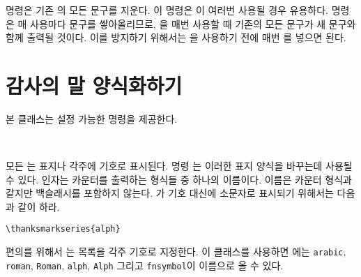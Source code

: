 \documentclass[10pt,a4paper]{oblivoir}
\begin{document}
\cmd{\emptythanks} 명령은 기존 \cmd{\thanks}의 모든 문구를 지운다.
이 명령은 \cmd{\maketitle}이 여러번 사용될 경우 유용하다.
\cmd{\thanks} 명령은 매 사용마다 문구를 쌓아올리므로, \cmd{\maketitle}을 매번
사용할 때 기존의 모든 \cmd{\thanks} 문구가 새 문구와 함께 출력될 것이다.
이를 방지하기 위해서는 \cmd{\maketitle}을 사용하기 전에 매번
\cmd{\emptythanks}를 넣으면 된다.


\section{감사의 말 양식화하기}

본 클래스는 설정 가능한 \cmd{\thanks} 명령을 제공한다.
\begin{tcolorbox}
\cmd{\thanksmarkseries}\\
\cmd{\symbolthanksmark}
\end{tcolorbox}
모든 \cmd{\thanks}는 표지나 각주에 기호로 표시된다.
명령 \cmd{\thanksmarkseries}는 이러한 표지 양식을 바꾸는데 사용될 수 있다.
 인자는 카운터를 출력하는 형식들 중 하나의 이름이다.
이름은 카운터 형식과 같지만 백슬래시를 포함하지 않는다.
\cmd{\thanks}가 기호 대신에 소문자로 표시되기 위해서는 다음과 같이 하라.
\begin{verbatim}
\thanksmarkseries{alph}
\end{verbatim}
편의를 위해서 \cmd{\symbolthanksmark}는 목록을 각주 기호로 지정한다.
이 클래스를 사용하면 에는 \texttt{arabic}, \texttt{roman},
\texttt{Roman}, \texttt{alph}, \texttt{Alph} 그리고 \texttt{fnsymbol}이
이름으로 올 수 있다.

\begin{tcolorbox}
\cmd{\continuousmarks}
\end{tcolorbox}
\end{document}
